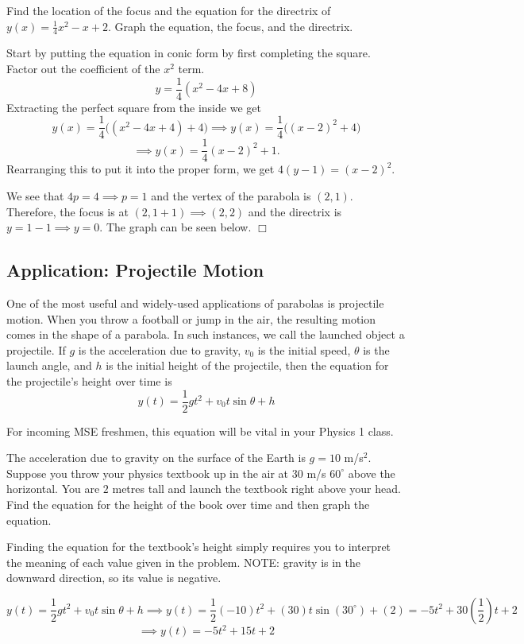 \documentclass[../book.tex]{subfiles}
\begin{document}
\begin{example}
Find the location of the focus and the equation for the directrix of $y(x) = \frac{1}{4}x^2-x+2$.  Graph the equation, the focus, and the directrix.
\end{example}
\begin{solution}
Start by putting the equation in conic form by first completing the square. \\
Factor out the coefficient of the $x^2$ term.
$$ y = \frac{1}{4}(x^2-4x+8) $$
Extracting the perfect square from the inside we get $$y(x)=\dfrac{1}{4}\big((x^2-4x+4)+4\big) \implies y(x)=\dfrac{1}{4}\big((x-2)^2+4\big)$$$$\implies y(x)=\dfrac{1}{4}(x-2)^2+1.$$
Rearranging this to put it into the proper form, we get $4(y-1) = (x-2)^2$.

We see that $4p = 4 \implies p = 1$ and the vertex of the parabola is $(2,1)$.  Therefore, the focus is at $(2,1+1)\implies(2,2)$ and the directrix is $y = 1-1 \implies y=0$.  The graph can be seen below. $\Box$
\end{solution}

\subsection{Application: Projectile Motion}
\noindent One of the most useful and widely-used applications of parabolas is projectile motion.  When you throw a football or jump in the air, the resulting motion comes in the shape of a parabola.  In such instances, we call the launched object a projectile.  If $g$ is the acceleration due to gravity, $v_0$ is the initial speed, $\theta$ is the launch angle, and $h$ is the initial height of the projectile, then the equation for the projectile's height over time is
$$y(t)=\frac{1}{2}gt^2+v_0t\sin{\theta}+h$$

\begin{remark}
For incoming MSE freshmen, this equation will be vital in your Physics 1 class.
\end{remark}

\begin{example}
The acceleration due to gravity on the surface of the Earth is $g = 10$ m/s$^2$.  Suppose you throw your physics textbook up in the air at $30$ m/s $60^{\circ}$ above the horizontal.  You are $2$ metres tall and launch the textbook right above your head.  Find the equation for the height of the book over time and then graph the equation.
\end{example}
\begin{solution}
Finding the equation for the textbook's height simply requires you to interpret the meaning of each value given in the problem.  NOTE: gravity is in the downward direction, so its value is negative.
\end{solution}
$$ y(t) = \frac{1}{2}gt^2 + v_0t\sin{\theta}+h \implies y(t)=\frac{1}{2}(-10)t^2 + (30)t\sin{(30^\circ)} + (2)= -5t^2 + 30\left(\frac{1}{2}\right)t + 2$$ $$\implies y(t) = -5t^2 + 15t + 2 $$
\end{document}
